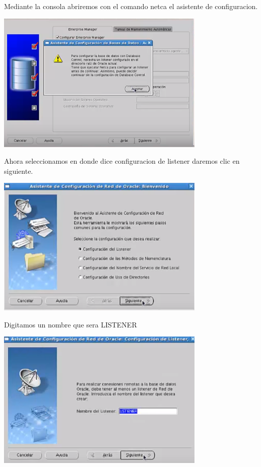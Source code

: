 \documentclass[12pt,letterpaper]{article}
\begin{document}
Mediante la consola abriremos con el comando netca el asistente de configuracion.\\
\begin{center}
\includegraphics[width=10cm]{oraclelinux/33.png}
\end{center}
Ahora seleccionamos en donde dice configuracion de listener daremos clic en siguiente. \\
\begin{center}
\includegraphics[width=10cm]{oraclelinux/34.png}
\end{center}
Digitamos un nombre que sera LISTENER \\
\begin{center}
\includegraphics[width=10cm]{oraclelinux/36.png}
\end{center}
\end{document}
